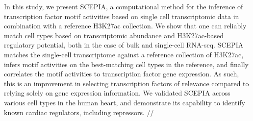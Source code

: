 In this study, we present SCEPIA, a computational method for the inference of transcription factor motif activities based on single cell transcriptomic data in combination with a reference H3K27ac collection. We show that one can reliably match cell types based on transcriptomic abundance and H3K27ac-based regulatory potential\cite{Wang2016}, both in the case of bulk and single-cell RNA-seq. SCEPIA matches the single-cell transcriptome against a reference collection of H3K27ac, infers motif activities on the best-matching cell types in the reference, and finally correlates the motif activities to transcription factor gene expression. As such, this is an improvement in selecting transcription factors of relevance compared to relying solely on gene expression information. We validated SCEPIA across various cell types in the human heart, and demonstrate its capability to identify known cardiac regulators, including repressors. 
//

